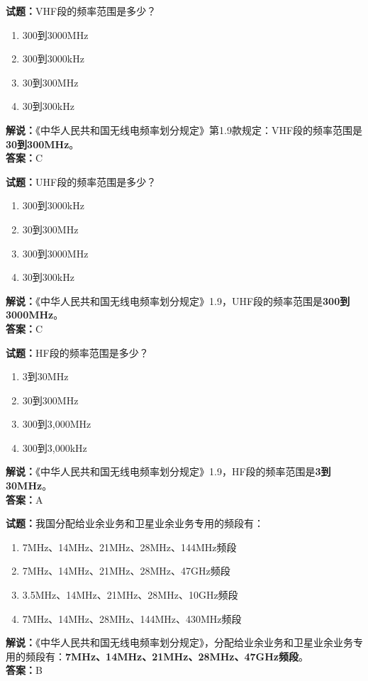 \documentclass{ctexbook}
\begin{document}
\bigskip


\noindent\textbf{试题：}VHF段的频率范围是多少？
\begin{enumerate}[leftmargin=3em]
	\item 300到3000MHz
	\item 300到3000kHz
	\item 30到300MHz
	\item 30到300kHz
\end{enumerate}
\noindent\textbf{解说：}《中华人民共和国无线电频率划分规定》第1.9款规定：VHF段的频率范围是\textbf{30到300MHz}。\\\noindent\textbf{答案：}C

\bigskip


\noindent\textbf{试题：}UHF段的频率范围是多少？
\begin{enumerate}[leftmargin=3em]
	\item 300到3000kHz
	\item 30到300MHz
	\item 300到3000MHz
	\item 30到300kHz
\end{enumerate}
\noindent\textbf{解说：}《中华人民共和国无线电频率划分规定》1.9，UHF段的频率范围是\textbf{300到3000MHz}。\\\noindent\textbf{答案：}C


\bigskip


\noindent\textbf{试题：}HF段的频率范围是多少？
\begin{enumerate}[leftmargin=3em]
	\item 3到30MHz
	\item 30到300MHz
	\item 300到3,000MHz
	\item 300到3,000kHz
\end{enumerate}
\noindent\textbf{解说：}《中华人民共和国无线电频率划分规定》1.9，HF段的频率范围是\textbf{3到30MHz}。\\\noindent\textbf{答案：}A


\bigskip


\noindent\textbf{试题：}我国分配给业余业务和卫星业余业务专用的频段有：
\begin{enumerate}[leftmargin=3em]
	\item 7MHz、14MHz、21MHz、28MHz、144MHz频段
	\item 7MHz、14MHz、21MHz、28MHz、47GHz频段
	\item 3.5MHz、14MHz、21MHz、28MHz、10GHz频段
	\item 7MHz、14MHz、28MHz、144MHz、430MHz频段
\end{enumerate}
\noindent\textbf{解说：}《中华人民共和国无线电频率划分规定》，分配给业余业务和卫星业余业务专用的频段有：\textbf{7MHz、14MHz、21MHz、28MHz、47GHz频段}。\\\noindent\textbf{答案：}B
\end{document}
